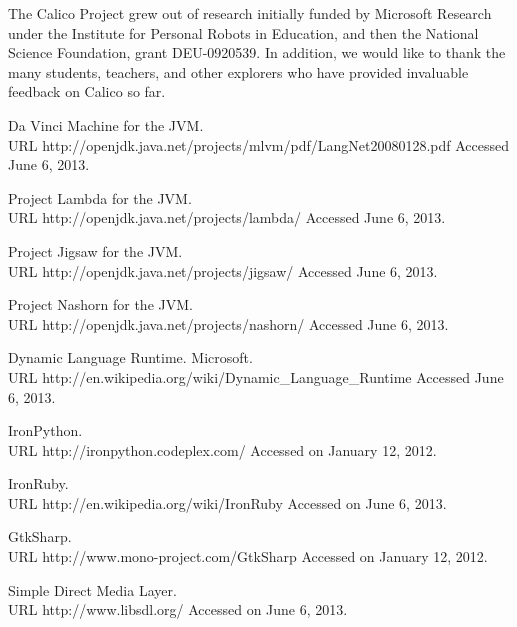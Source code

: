 \documentclass[preprint]{sigplanconf}
\begin{document}

\acks

The Calico Project grew out of research initially funded by Microsoft
Research under the Institute for Personal Robots in Education, and
then the National Science Foundation, grant DEU-0920539. In addition,
we would like to thank the many students, teachers, and other
explorers who have provided invaluable feedback on Calico so far.





\begin{thebibliography}{}
\softraggedright

Da Vinci Machine for the JVM.\\ URL http://openjdk.java.net/projects/mlvm/pdf/LangNet20080128.pdf Accessed June 6, 2013.

Project Lambda for the JVM.\\ URL http://openjdk.java.net/projects/lambda/ Accessed June 6, 2013.

Project Jigsaw for the JVM.\\ URL http://openjdk.java.net/projects/jigsaw/ Accessed June 6, 2013.

Project Nashorn for the JVM.\\ URL http://openjdk.java.net/projects/nashorn/ Accessed June 6, 2013.

Dynamic Language Runtime. Microsoft.\\ URL http://en.wikipedia.org/wiki/Dynamic\_Language\_Runtime Accessed June 6, 2013.

IronPython.\\ URL http://ironpython.codeplex.com/ Accessed on January 12, 2012.

IronRuby.\\ URL http://en.wikipedia.org/wiki/IronRuby Accessed on June 6, 2013.

GtkSharp.\\ URL http://www.mono-project.com/GtkSharp Accessed on January 12, 2012.

Simple Direct Media Layer.\\ URL http://www.libsdl.org/ Accessed on June 6, 2013.


\end{thebibliography}
\end{document}
